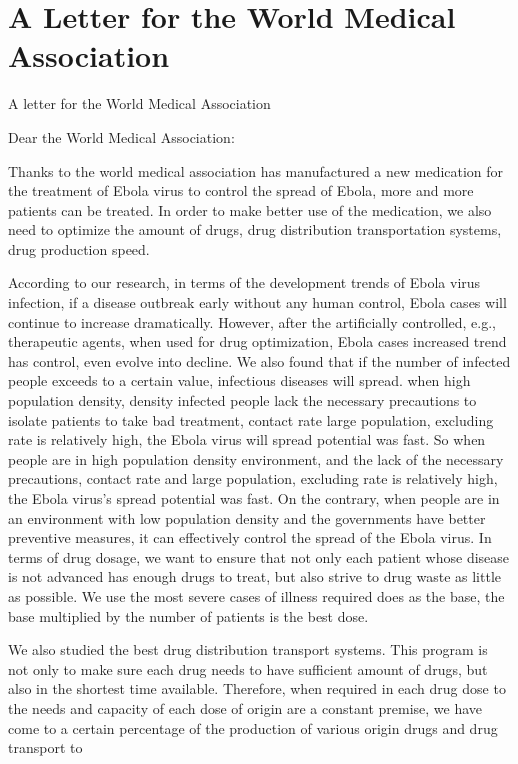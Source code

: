 \documentclass{icmmcm}
\begin{document}
\section{A Letter for the World Medical Association}
\centerline{A letter for the World Medical Association}
Dear the World Medical Association:
\par Thanks to the world medical association has manufactured a
new medication for the treatment of Ebola virus to control the
spread of Ebola, more and more patients can be treated. In
order to make better use of the medication, we also need to
optimize the amount of drugs, drug distribution transportation
systems, drug production speed.
\par According to our research, in terms of the development
trends of  Ebola virus infection, if a disease outbreak early
without any human control, Ebola cases will continue to
increase dramatically. However, after the artificially
controlled, e.g., therapeutic agents, when used for drug
optimization, Ebola cases increased trend has control, even
evolve into decline. We also found that if the number of
infected people exceeds to a certain value, infectious diseases
will spread. when high population density, density infected
people lack the necessary precautions to isolate patients to
take bad treatment, contact rate large population, excluding
rate is relatively high, the Ebola virus will spread potential
was fast. So when people are in high population density
environment, and the lack of the necessary precautions, contact
rate and large population, excluding rate is relatively high,
the Ebola virus's spread potential was fast. On the contrary,
when people are in an environment with low population density
and the governments have better preventive measures, it can
effectively control the spread of the Ebola virus. In terms of
drug dosage, we want to ensure that not only each patient whose
disease is not advanced has enough drugs to treat, but also
strive to drug waste as little as possible. We use the most
severe cases of illness required does as the base, the base
multiplied by the number of patients is the best dose.
\par We also studied the best drug distribution transport
systems. This program is not only to make sure each drug needs
to have sufficient amount of drugs, but also in the shortest
time available. Therefore, when required in each drug dose to
the needs and capacity of each dose of origin are a constant
premise, we have come to a certain percentage of the
production of various origin drugs and drug transport to
\end{document}
